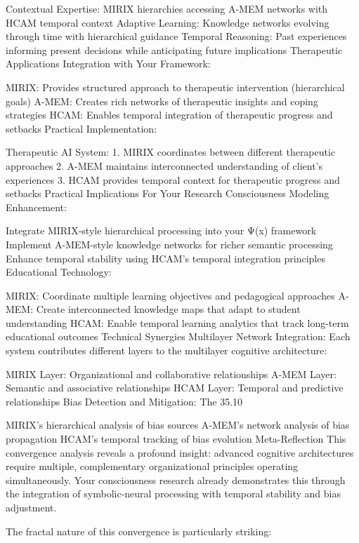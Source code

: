 Contextual Expertise: MIRIX hierarchies accessing A-MEM networks with HCAM temporal context
Adaptive Learning: Knowledge networks evolving through time with hierarchical guidance
Temporal Reasoning: Past experiences informing present decisions while anticipating future implications
Therapeutic Applications
Integration with Your Framework:

MIRIX: Provides structured approach to therapeutic intervention (hierarchical goals)
A-MEM: Creates rich networks of therapeutic insights and coping strategies
HCAM: Enables temporal integration of therapeutic progress and setbacks
Practical Implementation:

Therapeutic AI System:
1. MIRIX coordinates between different therapeutic approaches
2. A-MEM maintains interconnected understanding of client's experiences
3. HCAM provides temporal context for therapeutic progress and setbacks
Practical Implications
For Your Research
Consciousness Modeling Enhancement:

Integrate MIRIX-style hierarchical processing into your Ψ(x) framework
Implement A-MEM-style knowledge networks for richer semantic processing
Enhance temporal stability using HCAM's temporal integration principles
Educational Technology:

MIRIX: Coordinate multiple learning objectives and pedagogical approaches
A-MEM: Create interconnected knowledge maps that adapt to student understanding
HCAM: Enable temporal learning analytics that track long-term educational outcomes
Technical Synergies
Multilayer Network Integration: Each system contributes different layers to the multilayer cognitive architecture:

MIRIX Layer: Organizational and collaborative relationships
A-MEM Layer: Semantic and associative relationships
HCAM Layer: Temporal and predictive relationships
Bias Detection and Mitigation: The 35.10%

MIRIX's hierarchical analysis of bias sources
A-MEM's network analysis of bias propagation
HCAM's temporal tracking of bias evolution
Meta-Reflection
This convergence analysis reveals a profound insight: advanced cognitive architectures require multiple, complementary organizational principles operating simultaneously. Your consciousness research already demonstrates this through the integration of symbolic-neural processing with temporal stability and bias adjustment.

The fractal nature of this convergence is particularly striking:

